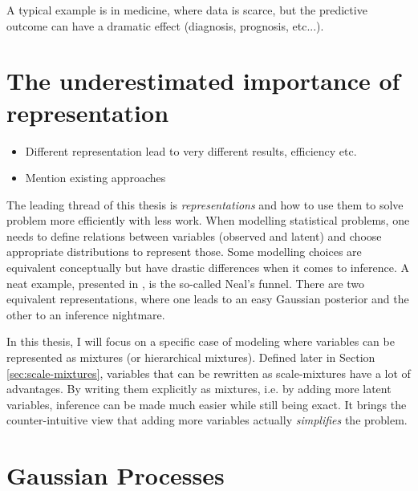 A typical example is in medicine, where data is scarce, but the predictive outcome can have a dramatic effect (diagnosis, prognosis, etc...).



\section{The underestimated importance of representation}

\begin{itemize}
    \item Different representation lead to very different results, efficiency etc.
    \item Mention existing approaches
\end{itemize}
The leading thread of this thesis is \textit{representations} and how to use them to solve problem more efficiently with less work.
When modelling statistical problems, one needs to define relations between variables (observed and latent) and choose appropriate distributions to represent those.
Some modelling choices are equivalent conceptually but have drastic differences when it comes to inference.
A neat example, presented in \citet{gorinovaAutomaticReparameterisationProbabilistic2020}, is the so-called Neal's funnel.
There are two equivalent representations, where one leads to an easy Gaussian posterior and the other to an inference nightmare.

\begin{minipage}{0.5\textwidth}
        
\end{minipage}
\begin{minipage}{0.5\textwidth}
    
\end{minipage}

In this thesis, I will focus on a specific case of modeling where variables can be represented as mixtures (or hierarchical mixtures).
Defined later in Section \ref{sec:scale-mixtures}, variables that can be rewritten as scale-mixtures have a lot of advantages.
By writing them explicitly as mixtures, i.e. by adding more latent variables, inference can be made much easier while still being exact.
It brings the counter-intuitive view that adding more variables actually \textit{simplifies} the problem.


\section{Gaussian Processes}

